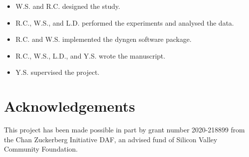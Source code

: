 \documentclass[10pt, a4paper]{article}
\begin{document}
\begin{itemize}
\item W.S. and R.C. designed the study.
\item R.C., W.S., and L.D. performed the experiments and analysed the data.
\item R.C. and W.S. implemented the dyngen software package.
\item R.C., W.S., L.D., and Y.S. wrote the manuscript.
\item Y.S. supervised the project.
\end{itemize}

\section{Acknowledgements}
This project has been made possible in part by grant number 2020-218899 from the Chan Zuckerberg Initiative DAF, an advised fund of Silicon Valley Community Foundation.
\end{document}
